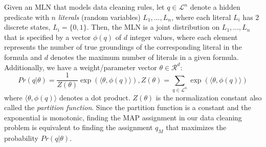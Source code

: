 


Given an MLN that models data cleaning rules, let $q \in \mathcal{L}^n$ denote a hidden predicate with $n$ \emph{literals} (random variables) $L_1,...,L_n$, where each literal $L_i$
has $2$ discrete states, $L_i = \lbrace 0,1 \rbrace$.
Then, the MLN is a joint distribution on  $L_1,...,L_n$ that 
is specified by a vector $\phi(q)$ of $d$ integer values, where
each element represents the number of true groundings of the 
corresponding literal in the formula and $d$ denotes the 
maximum number of literals in a given formula. Additionally, 
we have a weight/parameter vector $\theta \in \mathcal{R}^d$:
\begin{equation*}
Pr \left( q | \theta \right) = 
\frac{1}{Z(\theta)} \exp\left( \langle \theta, \phi(q) \rangle  \right), 
Z(\theta) = \sum_{q \in \mathcal{L}^n}\exp\left( \langle \theta, \phi(q) \rangle  \right) 
\end{equation*}
where $\langle \theta, \phi(q) \rangle$ denotes a dot product. 
$Z(\theta)$ is the normalization constant also called the 
\emph{partition function}. Since the partition function is a constant and the exponential is monotonic, finding the MAP assignment in our data cleaning problem is equivalent to finding the assignment $q_M$ that maximizes the probability $Pr \left( q | \theta \right)$.

